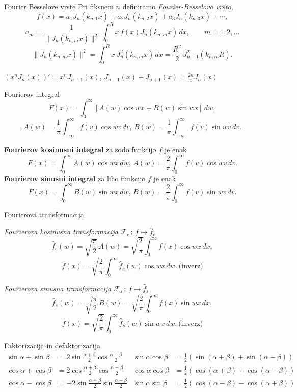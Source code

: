 \documentclass[a4paper,10pt]{article}
\begin{document}
\begin{multicols}{2}
\begin{formulaBox}{Fourier Besselove vrste}
	Pri fiksnem $n$ definiramo  \emph{Fourier-Besselovo vrsto},
	$$f(x)=%
	a_1 J_n(k_{n,1}x)+a_2 J_n(k_{n,2}x)+a_3 J_n(k_{n,3}x)+\cdots, $$
	$$a_m=\frac{1}{\parallel J_n(k_{n,m}x)\parallel ^2 }\, \int_0^R x\,f(x)J_n(k_{n,m}x)\,dx,\qquad m=1,2,...$$	
	$$	\parallel J_n(k_{n,m}x)\parallel ^2=\int_0^R x\,J_n^2(k_{n,m}x)\,dx=\frac{R^2}{2}\, J_{n+1}^2(k_{n,m}R).$$

	$(x^nJ_n(x))'=x^nJ_{n-1}(x)$, $J_{n-1}(x)+J_{n+1}(x)=\frac{2n}{x}J_n(x)$
\end{formulaBox}

\begin{formulaBox}{Fourierov integral}
	$$
	F(x)=\int_0^\infty \left[ A(w)\cos wx+B(w)\sin wx\right] \,dw,
	$$
$$A(w)=\frac{1}{\pi}\int_{-\infty}^{\infty}f(v)\cos w v \,dv,\, B(w)=\frac{1}{\pi}\int_{-\infty}^{\infty}f(v)\sin w v \,dv.$$

	\textbf{Fourierov kosinusni integral} za sodo funkcijo $f$ je enak
	$$	F(x)=\int_0^\infty  A(w)\cos wx\,dw,\,
		A(w)=\frac{2}{\pi}\int_{0}^{\infty}f(v)\cos w v \,dv.$$
	\textbf{Fourierov sinusni integral} za liho funkcijo $f$ je enak
	$$	F(x)=\int_0^\infty  B(w)\sin wx\,dw,\,
	B(w)=\frac{2}{\pi}\int_{0}^{\infty}f(v)\sin w v \,dv.$$

\end{formulaBox}

\begin{formulaBox}{Fourierova transformacija}

	\emph{Fourierova kosinusna transformacija} ${\mathscr{F}}_c\,:\, f\mapsto \hat f_c$
	$$\hat f_c(w)=\sqrt{\frac{\pi}{2}}\,A(w)=\sqrt{\frac{2}{\pi}} \int_0^\infty f(x)\cos wx \,dx,$$
	$$	f(x)=\sqrt{\frac{2}{\pi}} \int_0^\infty \hat f_c(w)\cos wx \,dw. \ \text{(inverz)}$$

	\emph{Fourierova sinusna transformacija} ${\mathscr{F}}_s\,:\, f\mapsto \hat f_s$ 
	$$\hat f_s(w)=\sqrt{\frac{\pi}{2}}\,B(w)=\sqrt{\frac{2}{\pi}} \int_0^\infty f(x)\sin wx \,dx,$$
	$$f(x)=\sqrt{\frac{2}{\pi}} \int_0^\infty \hat f_s(w)\sin wx \,dw.\ \text{(inverz)}$$

\end{formulaBox}

\end{multicols}
\begin{formulaBox}{Faktorizacija in defaktorizacija}
\begin{align*}
\sin \alpha + \sin \beta &= 2 \sin \frac{\alpha + \beta}{2} \cos \frac{\alpha - \beta}{2} & \sin \alpha \cos \beta &= \frac{1}{2}(\sin(\alpha + \beta) + \sin(\alpha - \beta)) \\
\cos \alpha + \cos \beta &= 2 \cos \frac{\alpha + \beta}{2} \cos \frac{\alpha - \beta}{2} & \cos \alpha \cos \beta &= \frac{1}{2}(\cos(\alpha + \beta) + \cos(\alpha - \beta)) \\
\cos \alpha - \cos \beta &= -2 \sin \frac{\alpha + \beta}{2} \sin \frac{\alpha - \beta}{2} & \sin \alpha \sin \beta &= \frac{1}{2}(\cos(\alpha - \beta) - \cos(\alpha + \beta))
\end{align*}
\end{formulaBox}
\end{document}
